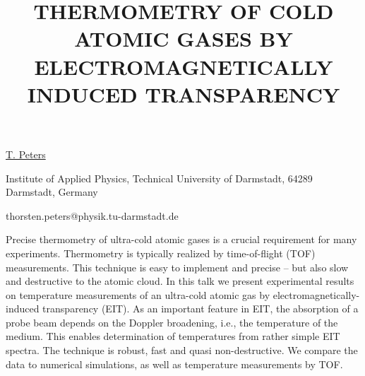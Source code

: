 \title{THERMOMETRY OF COLD ATOMIC GASES BY ELECTROMAGNETICALLY INDUCED TRANSPARENCY}

\underline{T. Peters} 

{\normalsize{\vspace{-4mm}
Institute of Applied Physics, Technical University of Darmstadt,
64289 Darmstadt, Germany

\email thorsten.peters@physik.tu-darmstadt.de}}

Precise thermometry of ultra-cold atomic gases is a crucial requirement for many experiments. Thermometry is typically realized by time-of-flight (TOF) measurements.
This technique is easy to implement and precise -- but also slow and destructive to the atomic cloud. In this talk we present experimental results on temperature measurements of an ultra-cold atomic gas by electromagnetically-induced transparency (EIT). As an important feature in EIT, the
absorption of a probe beam depends on the Doppler broadening, i.e., the temperature of the medium. This enables determination of temperatures from rather simple EIT spectra. The technique is robust, fast and quasi non-destructive. We compare the data to numerical simulations, as well as temperature measurements by TOF.

\vspace{\baselineskip} 